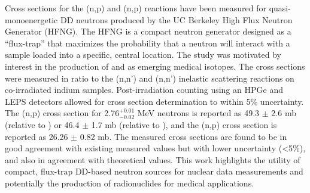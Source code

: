 






Cross sections for the (n,p) and (n,p) reactions have been measured for quasi-monoenergetic DD neutrons produced by the UC Berkeley High Flux Neutron Generator (HFNG).
The HFNG is a compact neutron generator designed as a \enquote{flux-trap} that maximizes the probability that a neutron will interact with a sample loaded into a specific, central location.  
The study was motivated by interest in the production of  and  as emerging medical isotopes.
The cross sections were measured in ratio to the (n,n') and (n,n') inelastic scattering reactions on co-irradiated indium samples.
Post-irradiation counting using an HPGe and LEPS detectors allowed for cross section determination to within 5\% uncertainty.
The (n,p) cross section for 2.76$^{+0.01}_{-0.02}$ MeV neutrons is reported as    49.3 $\pm$ 2.6 mb (relative to ) or 46.4 $\pm$ 1.7 mb (relative to ), and the (n,p) cross section is reported as 26.26 $\pm$  0.82 mb.
The measured cross sections  are found to be  in good agreement with existing measured values but with lower uncertainty (\textless 5\%), and also in agreement with  theoretical values.
This work highlights the utility of compact, flux-trap DD-based neutron sources for nuclear data measurements and potentially the production of radionuclides for medical applications.





